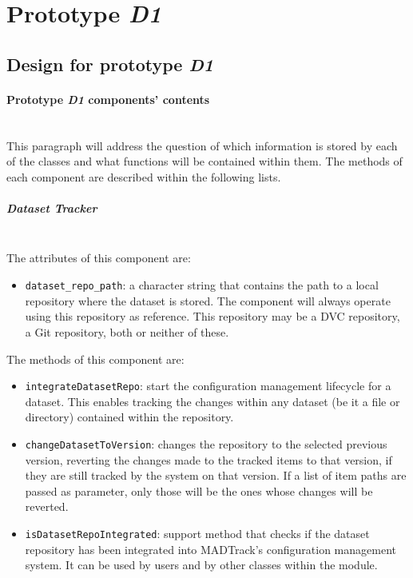 \section {Prototype \emph{D1}}

\subsection{Design for prototype \emph{D1}}

\paragraph{Prototype \emph{D1} components' contents}\mbox{}\\

This paragraph will address the question of which information is stored by each of the classes and what functions will be contained within them. The methods of each component 
are described within the following lists.

\subparagraph{Dataset Tracker}\mbox{}\\


The attributes of this component are:

\begin{itemize}
    \item \texttt{dataset\_repo\_path}: a character string that contains the path to a local repository where the dataset is stored. The component 
    will always operate using this repository as reference. This repository may be a DVC repository, a Git repository, both or neither of these.
\end{itemize}

The methods of this component are:

\begin{itemize}
    \item \texttt{integrateDatasetRepo}: start the configuration management lifecycle for a dataset. This enables tracking the changes within any dataset (be it a 
    file or directory) contained within the repository.

    \item \texttt{changeDatasetToVersion}: changes the repository to the selected previous version, reverting the changes made to the tracked items to that version, 
    if they are still tracked by the system on that version. If a list of item paths are passed as parameter, only those will be the ones whose changes will be 
    reverted.

    \item \texttt{isDatasetRepoIntegrated}: support method that checks if the dataset repository has been integrated into MADTrack's configuration management system. 
    It can be used by users and by other classes within the module.

\end{itemize}

